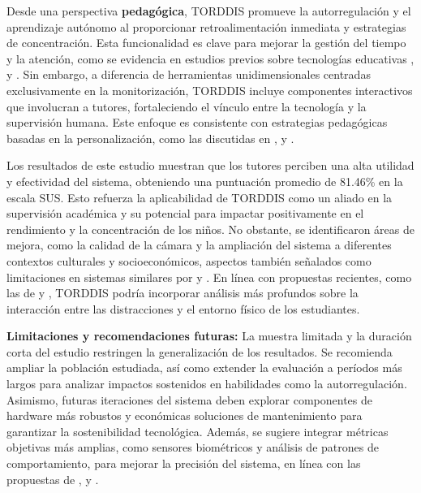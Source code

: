 \documentclass[a4paper,fleqn]{cas-sc}
\begin{document}
		Desde una perspectiva \textbf{pedagógica}, TORDDIS promueve la autorregulación y el aprendizaje autónomo al proporcionar retroalimentación inmediata y estrategias de concentración. Esta funcionalidad es clave para mejorar la gestión del tiempo y la atención, como se evidencia en estudios previos sobre tecnologías educativas \cite{Palmer2022impact}, \cite{Roberts2020Task} y \cite{Wang2022Empowering}. Sin embargo, a diferencia de herramientas unidimensionales centradas exclusivamente en la monitorización, TORDDIS incluye componentes interactivos que involucran a tutores, fortaleciendo el vínculo entre la tecnología y la supervisión humana. Este enfoque es consistente con estrategias pedagógicas basadas en la personalización, como las discutidas en \cite{Salter2014Exploring}, \cite{Bembich2016Future} y \cite{Adcroft2018Developing}.
		
		Los resultados de este estudio muestran que los tutores perciben una alta utilidad y efectividad del sistema, obteniendo una puntuación promedio de 81.46\% en la escala SUS. Esto refuerza la aplicabilidad de TORDDIS como un aliado en la supervisión académica y su potencial para impactar positivamente en el rendimiento y la concentración de los niños. No obstante, se identificaron áreas de mejora, como la calidad de la cámara y la ampliación del sistema a diferentes contextos culturales y socioeconómicos, aspectos también señalados como limitaciones en sistemas similares por \cite{Bembich2016Future} y \cite{Muljana2022Instructional}. En línea con propuestas recientes, como las de \cite{Narkhede2023} y \cite{Ucar2022Recognizing}, TORDDIS podría incorporar análisis más profundos sobre la interacción entre las distracciones y el entorno físico de los estudiantes.
		
		\textbf{Limitaciones y recomendaciones futuras:} La muestra limitada y la duración corta del estudio restringen la generalización de los resultados. Se recomienda ampliar la población estudiada, así como extender la evaluación a períodos más largos para analizar impactos sostenidos en habilidades como la autorregulación. Asimismo, futuras iteraciones del sistema deben explorar componentes de hardware más robustos y económicas soluciones de mantenimiento para garantizar la sostenibilidad tecnológica. Además, se sugiere integrar métricas objetivas más amplias, como sensores biométricos y análisis de patrones de comportamiento, para mejorar la precisión del sistema, en línea con las propuestas de \cite{VilliersRader2021}, \cite{Hachad2020} y \cite{Ozdamli2022}.
		
\end{document}
